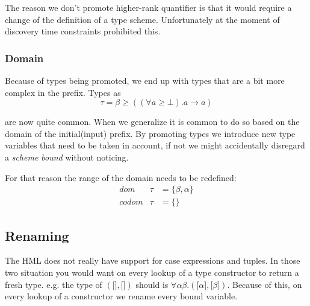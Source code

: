 The reason we don't promote higher-rank quantifier is that it would require a change of the definition of a type scheme. Unfortunately at the moment of discovery time constraints prohibited this.
\subsubsection{Domain}
Because of types being promoted, we end up with types that are a bit more complex in the prefix. Types as 
\begin{equation}
\tau = \beta \geq ((\forall a \geq \bot). a \rightarrow a)
\end{equation}

are now quite common. When we generalize it is common to do so based on the domain of the initial(input) prefix. By promoting types we introduce new type variables that need to be taken in account, if not we might accidentally disregard a \emph{scheme bound} without noticing.

For that reason the range of the domain needs to be redefined:
\begin{eqnarray*}
dom   &\tau& = \{\beta, \alpha\}\\
codom &\tau& = \{\}
\end{eqnarray*}
\subsection{Renaming}

The HML does not really have support for case expressions and tuples. In those two situation you would want on every lookup of a type constructor to return a fresh type. e.g. the type of $(\lbrack \rbrack, \lbrack \rbrack)$ should is $\forall \alpha \beta . (\lbrack \alpha \rbrack, \lbrack \beta \rbrack)$. Because of this, on every lookup of a constructor we rename every bound variable.
